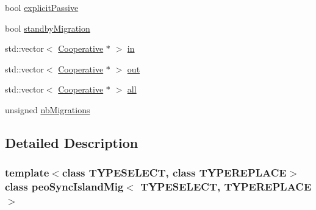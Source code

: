 \begin{CompactItemize}
\item 
\hypertarget{classpeoSyncIslandMig_253dfbfebfadad0b4f49e60bb811b1db}{
bool \hyperlink{classpeoSyncIslandMig_253dfbfebfadad0b4f49e60bb811b1db}{explicit\-Passive}}
\label{classpeoSyncIslandMig_253dfbfebfadad0b4f49e60bb811b1db}

\item 
\hypertarget{classpeoSyncIslandMig_e5d64ff9718b746d2307379fb061ad96}{
bool \hyperlink{classpeoSyncIslandMig_e5d64ff9718b746d2307379fb061ad96}{standby\-Migration}}
\label{classpeoSyncIslandMig_e5d64ff9718b746d2307379fb061ad96}

\item 
\hypertarget{classpeoSyncIslandMig_6274e5185b6b7579dea71da3138d9d23}{
std::vector$<$ \hyperlink{classCooperative}{Cooperative} $\ast$ $>$ \hyperlink{classpeoSyncIslandMig_6274e5185b6b7579dea71da3138d9d23}{in}}
\label{classpeoSyncIslandMig_6274e5185b6b7579dea71da3138d9d23}

\item 
\hypertarget{classpeoSyncIslandMig_daae2fea2f447d35927e18a8f008a45d}{
std::vector$<$ \hyperlink{classCooperative}{Cooperative} $\ast$ $>$ \hyperlink{classpeoSyncIslandMig_daae2fea2f447d35927e18a8f008a45d}{out}}
\label{classpeoSyncIslandMig_daae2fea2f447d35927e18a8f008a45d}

\item 
\hypertarget{classpeoSyncIslandMig_2760dde833d7141ca86affb4df0fb163}{
std::vector$<$ \hyperlink{classCooperative}{Cooperative} $\ast$ $>$ \hyperlink{classpeoSyncIslandMig_2760dde833d7141ca86affb4df0fb163}{all}}
\label{classpeoSyncIslandMig_2760dde833d7141ca86affb4df0fb163}

\item 
\hypertarget{classpeoSyncIslandMig_cdd55a0ab14d659a2a68674a05ed8a1d}{
unsigned \hyperlink{classpeoSyncIslandMig_cdd55a0ab14d659a2a68674a05ed8a1d}{nb\-Migrations}}
\label{classpeoSyncIslandMig_cdd55a0ab14d659a2a68674a05ed8a1d}

\end{CompactItemize}


\subsection{Detailed Description}
\subsubsection*{template$<$class TYPESELECT, class TYPEREPLACE$>$ class peo\-Sync\-Island\-Mig$<$ TYPESELECT, TYPEREPLACE $>$}

